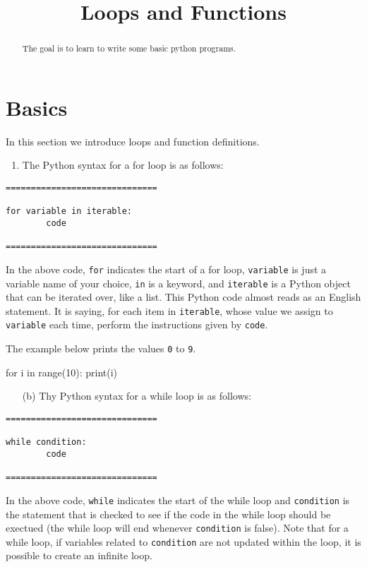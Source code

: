 \documentclass{ximera}
\title{Loops and Functions}
\begin{document}
\begin{abstract}
The goal is to learn to write some basic python programs.
\end{abstract}
\maketitle

\section{Basics}

In this section we introduce loops and function definitions.

	\begin{enumerate}
        	\item The Python syntax for a for loop is as follows:
	\end{enumerate}
\begin{verbatim}
==============================

for variable in iterable:
        code

==============================
\end{verbatim}

In the above code, \verb|for| indicates the start of a for loop, \verb|variable| is just a variable name of your choice, \verb|in| is a keyword, and \verb|iterable| is a Python object that can be iterated over, like a list. This Python code almost reads as an English statement. It is saying, for each item in \verb|iterable|, whose value we assign to \verb|variable| each time, perform the instructions given by \verb|code|.

The example below prints the values \verb|0| to \verb|9|.

\begin{sageCell}
for i in range(10):
        print(i)
\end{sageCell}

	\begin{enumerate}
		\item[(b)] Thy Python syntax for a while loop is as follows: 
	\end{enumerate}
\begin{verbatim}
==============================

while condition:
        code

==============================
\end{verbatim}

In the above code, \verb|while| indicates the start of the while loop and \verb|condition| is the statement that is checked to see if the code in the while loop should be exectued (the while loop will end whenever \verb|condition| is false). Note that for a while loop, if variables related to \verb|condition| are not updated within the loop, it is possible to create an infinite loop.
\end{document}
